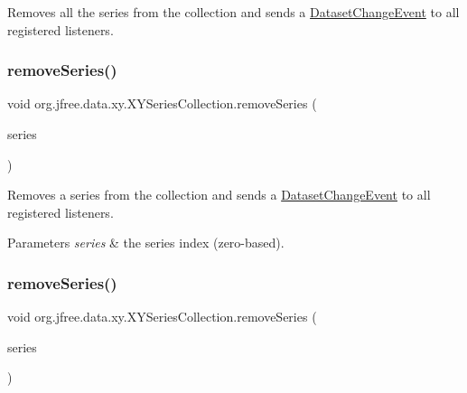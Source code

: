 Removes all the series from the collection and sends a \mbox{\hyperlink{}{Dataset\+Change\+Event}} to all registered listeners. \mbox{\label{classorg_1_1jfree_1_1data_1_1xy_1_1_x_y_series_collection_aa23250e0a18ae4f347c24848c0f97210}} 
\subsubsection{\texorpdfstring{remove\+Series()}{removeSeries()}\hspace{0.1cm}{\footnotesize\ttfamily [1/2]}}
{\footnotesize\ttfamily void org.\+jfree.\+data.\+xy.\+X\+Y\+Series\+Collection.\+remove\+Series (\begin{DoxyParamCaption}\item[{int}]{series }\end{DoxyParamCaption})}

Removes a series from the collection and sends a \mbox{\hyperlink{}{Dataset\+Change\+Event}} to all registered listeners.


\begin{DoxyParams}{Parameters}
{\em series} & the series index (zero-\/based). \\
\hline
\end{DoxyParams}
\mbox{\label{classorg_1_1jfree_1_1data_1_1xy_1_1_x_y_series_collection_a3608eb7467ee118e7b73bae53b4e4fc3}} 
\subsubsection{\texorpdfstring{remove\+Series()}{removeSeries()}\hspace{0.1cm}{\footnotesize\ttfamily [2/2]}}
{\footnotesize\ttfamily void org.\+jfree.\+data.\+xy.\+X\+Y\+Series\+Collection.\+remove\+Series (\begin{DoxyParamCaption}\item[{\mbox{\hyperlink{classorg_1_1jfree_1_1data_1_1xy_1_1_x_y_series}{X\+Y\+Series}}}]{series }\end{DoxyParamCaption})}

